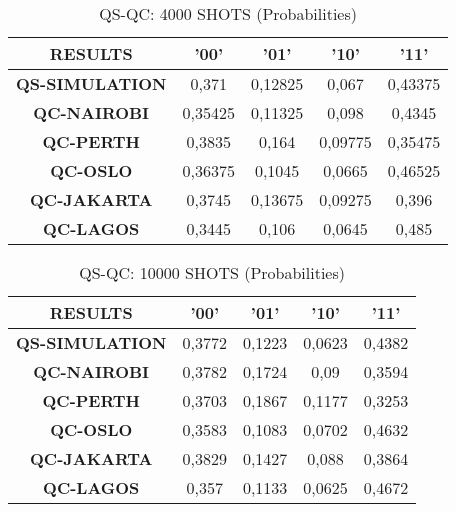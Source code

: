 \begin{table}[!ht]
    \centering
    \begin{tabular}{ccccc}
    \hline
        \textbf{RESULTS} & \textbf{'00'} & \textbf{'01'} & \textbf{'10'} & \textbf{'11' } \\ \hline
        \textbf{QS-SIMULATION} & 0,371 & 0,12825 & 0,067 & 0,43375  \\ 
        \textbf{QC-NAIROBI} & 0,35425 & 0,11325 & 0,098 & 0,4345  \\ 
        \textbf{QC-PERTH} & 0,3835 & 0,164 & 0,09775 & 0,35475  \\ 
        \textbf{QC-OSLO} & 0,36375 & 0,1045 & 0,0665 & 0,46525  \\ 
        \textbf{QC-JAKARTA} & 0,3745 & 0,13675 & 0,09275 & 0,396  \\ 
        \textbf{QC-LAGOS} & 0,3445 & 0,106 & 0,0645 & 0,485 \\ \hline
    \end{tabular}
    \caption{QS-QC: 4000 SHOTS (Probabilities)}
\end{table}

\begin{table}[!ht]
    \centering
    \begin{tabular}{ccccc}
    \hline
        \textbf{RESULTS} & \textbf{'00'} & \textbf{'01'} & \textbf{'10'} & \textbf{'11' } \\ \hline
        \textbf{QS-SIMULATION} & 0,3772 & 0,1223 & 0,0623 & 0,4382  \\ 
        \textbf{QC-NAIROBI} & 0,3782 & 0,1724 & 0,09 & 0,3594  \\ 
        \textbf{QC-PERTH} & 0,3703 & 0,1867 & 0,1177 & 0,3253  \\ 
        \textbf{QC-OSLO} & 0,3583 & 0,1083 & 0,0702 & 0,4632  \\ 
        \textbf{QC-JAKARTA} & 0,3829 & 0,1427 & 0,088 & 0,3864  \\ 
        \textbf{QC-LAGOS} & 0,357 & 0,1133 & 0,0625 & 0,4672 \\ \hline
    \end{tabular}
    \caption{QS-QC: 10000 SHOTS (Probabilities)}
\end{table}

